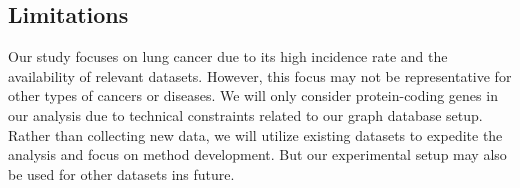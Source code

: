 \subsection{Limitations} \label{subsec:limitations}
Our study focuses on lung cancer due to its high incidence rate and the availability of relevant datasets.
However, this focus may not be representative for other types of cancers or diseases.
We will only consider protein-coding genes in our analysis due to technical constraints related to our graph database setup.
Rather than collecting new data, we will utilize existing datasets to expedite the analysis and focus on method development.
But our experimental setup may also be used for other datasets ins future.\\
